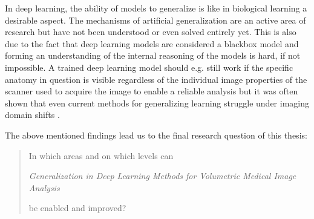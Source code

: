     In deep learning, the ability of models to generalize is like in biological learning a desirable aspect.
    The mechanisms of artificial generalization are an active area of research but have not been understood or even solved entirely yet.
    This is also due to the fact that deep learning models are considered a blackbox model and forming an understanding of the internal reasoning of the models is hard, if not impossible.
    A trained deep learning model should e.g. still work if the specific anatomy in question is visible regardless of the individual image properties of the scanner used to acquire the image to enable a reliable analysis but it was often shown that even current methods for generalizing learning struggle under imaging domain shifts \citep{ouyang2022causality}.

    The above mentioned findings lead us to the final research question of this thesis:

    \begin{quote}
        \centering \Large
        In which areas and on which levels can

        \noindent \emph{Generalization in Deep Learning Methods for Volumetric Medical Image Analysis}

        \noindent be enabled and improved?
    \end{quote}





